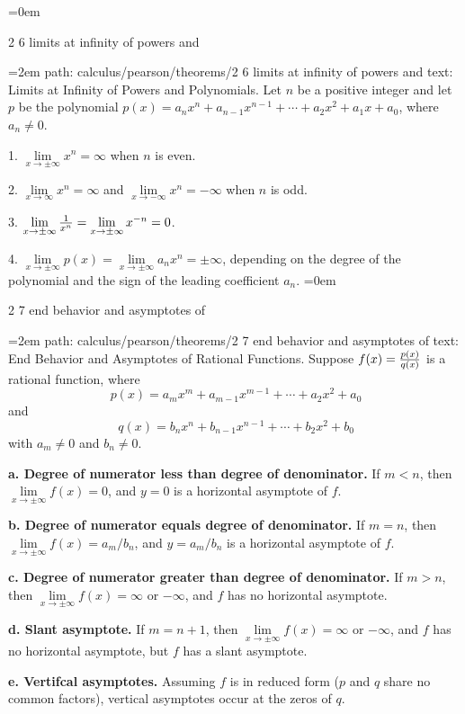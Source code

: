 \smallskip
\leftskip=0em
\par\endgroup
\bigskip
{}
2 6 limits at infinity of powers and
\smallskip
\par\begingroup
\leftskip=2em
path: calculus/pearson/theorems/2 6 limits at infinity of powers and
\smallskip
text:  Limits at Infinity of Powers and Polynomials. Let $n$ be a positive integer and let $p$ be the polynomial  $p(x) = a_n x^n + a_{n - 1}x^{n - 1} + \cdots + a_2 x^2 + a_1x + a_0$, where $a_n \ne 0$. \par 1. $\lim\limits_{x \to \pm\infty} x^n = \infty$ when $n$ is even.  \par 2. $\lim\limits_{x \to \infty} x^n = \infty$ and $\lim\limits_{x \to -\infty} x^n = -\infty$ when $n$ is odd.  \par 3. $\lim\limits_{x \to \pm\infty} {1 \over x^n} = \lim\limits_{x \to \pm\infty} {x^{-n}} = 0 $.  \par 4. $\lim\limits_{x \to \pm\infty} p(x)= \lim\limits_{x \to \pm\infty} a_nx^n= \pm\infty$, depending on the degree of the polynomial and the sign of the leading coefficient $a_n$. 
\smallskip
\leftskip=0em
\par\endgroup
\bigskip
{}
2 7 end behavior and asymptotes of
\smallskip
\par\begingroup
\leftskip=2em
path: calculus/pearson/theorems/2 7 end behavior and asymptotes of
\smallskip
text:  End Behavior and Asymptotes of Rational Functions. Suppose $f(x) = {p(x) \over q(x)}$ is a rational function, where $$\ p(x) = a_mx^m + a_{m-1}x^{m-1} + \cdots + a_2x^2 + a_0 $$  and  $$\ q(x) = b_nx^n + b_{n-1}x^{n-1} + \cdots + b_2x^2 + b_0 $$  with $a_m \ne 0$ and $b_n \ne 0$.  \par {\bf a. Degree of numerator less than degree of denominator.} If $m < n$, then $\lim\limits_{x \to \pm\infty} f(x) = 0$, and $y = 0$ is a horizontal asymptote of $f$.  \par {\bf b. Degree of numerator equals degree of denominator.} If $m = n$, then $\lim\limits_{x \to \pm\infty} f(x) = a_m/b_n$, and $y = a_m/b_n$ is a horizontal asymptote of $f$.  \par {\bf c. Degree of numerator greater than degree of denominator.} If $m > n$, then $\lim\limits_{x \to \pm\infty} f(x) = \infty$ or $-\infty$, and $f$ has no horizontal asymptote.  \par {\bf d. Slant asymptote.}  If $m = n + 1$, then $\lim\limits_{x \to \pm\infty} f(x) = \infty$ or $-\infty$, and $f$ has no horizontal asymptote, but $f$ has a slant asymptote.  \par {\bf e. Vertifcal asymptotes.} Assuming $f$ is in reduced form ($p$ and $q$ share no common factors), vertical asymptotes occur at the zeros of $q$.
